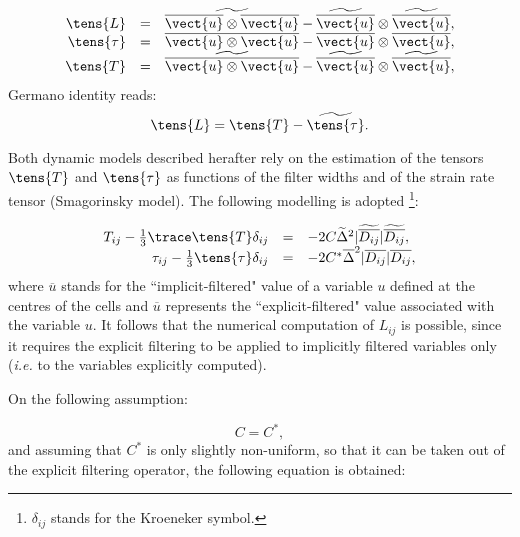 \begin{description}
\begin{equation}
\begin{array}{ r c l}
\tens{L} & = &\widetilde{\overline{\vect{u}} \otimes \overline{\vect{u}}}
-\widetilde{\overline{\vect{u}}} \otimes \widetilde{\overline{ \vect{u}}}, \\
\tens{\tau} & = & \overline{ \vect{u} \otimes \vect{u}}-\overline{\vect{u}} \otimes \overline{ \vect{u}}, \\
\tens{T} &= &\widetilde{\overline{ \vect{u} \otimes \vect{u}}}-\widetilde{\overline{\vect{u}}} \otimes
\widetilde{\overline{ \vect{u}}},
\end{array}
\end{equation}
Germano identity reads:
\begin{equation}
\tens{L} = \tens{T}-\widetilde{\tens{\tau}}.
\end{equation}

Both dynamic models described herafter rely on the estimation of the tensors
$\tens{T}$ and $\tens{\tau}$ as functions of the filter widths and of the
strain rate tensor (Smagorinsky model). The following modelling is adopted%
\footnote{$\delta_{ij}$ stands for the Kroeneker symbol.}:

\begin{equation}
\begin{array}{ r c l}
T_{ij}-\frac{1}{3}\trace \tens{T} \delta_{ij} &=& -2 C \widetilde{\Delta}^2 |\widetilde{%
\overline{D_{ij}}}| \widetilde{\overline{D_{ij}}}, \\
\tau_{ij}-\frac{1}{3} \tens{\tau } \delta_{ij} &=& -2 C^* \overline{\Delta}^2 |%
\overline{D_{ij}}| \overline{D_{ij}} ,
\end{array}
\end{equation}
where 
$\overline{u}$ stands for the ``implicit-filtered" value of a variable $u$
defined at the centres of the cells and $\overline{u}$ represents the
``explicit-filtered" value associated with the variable $u$. It follows that
the numerical computation of $L_{ij}$ is possible, since it requires the
explicit filtering to be applied to implicitly filtered variables only 
(\textit{i.e.} to the variables explicitly computed).

On the following assumption:

\begin{equation}
C = C^*,
\end{equation}
and assuming that $C^*$ is only slightly non-uniform, so that it can be
taken out of the explicit filtering operator, the following equation is
obtained:


\end{description}
